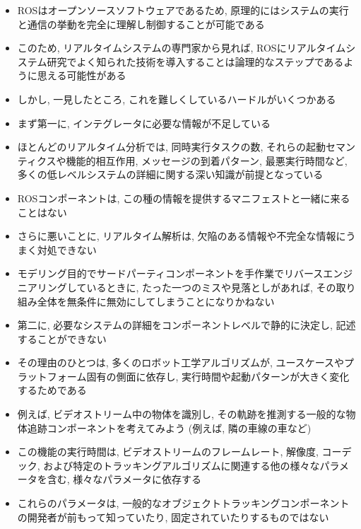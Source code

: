 \begin{frame}{}
    \begin{itemize}
        \item ROSはオープンソースソフトウェアであるため, 原理的にはシステムの実行と通信の挙動を完全に理解し制御することが可能である
        \item このため, リアルタイムシステムの専門家から見れば, ROSにリアルタイムシステム研究でよく知られた技術を導入することは論理的なステップであるように思える可能性がある
        \item しかし, 一見したところ, これを難しくしているハードルがいくつかある
    \end{itemize}
\end{frame}

\begin{frame}{}
    \begin{itemize}
        \item まず第一に, インテグレータに必要な情報が不足している
        \item ほとんどのリアルタイム分析では, 同時実行タスクの数, それらの起動セマンティクスや機能的相互作用, メッセージの到着パターン, 最悪実行時間など, 多くの低レベルシステムの詳細に関する深い知識が前提となっている
        \item ROSコンポーネントは, この種の情報を提供するマニフェストと一緒に来ることはない
        \item さらに悪いことに, リアルタイム解析は, 欠陥のある情報や不完全な情報にうまく対処できない
        \item モデリング目的でサードパーティコンポーネントを手作業でリバースエンジニアリングしているときに, たった一つのミスや見落としがあれば, その取り組み全体を無条件に無効にしてしまうことになりかねない
    \end{itemize}
\end{frame}

\begin{frame}{}
    \begin{itemize}
        \item 第二に, 必要なシステムの詳細をコンポーネントレベルで静的に決定し, 記述することができない
        \item その理由のひとつは, 多くのロボット工学アルゴリズムが, ユースケースやプラットフォーム固有の側面に依存し, 実行時間や起動パターンが大きく変化するためである
        \item 例えば, ビデオストリーム中の物体を識別し, その軌跡を推測する一般的な物体追跡コンポーネントを考えてみよう (例えば, 隣の車線の車など)
        \item この機能の実行時間は, ビデオストリームのフレームレート, 解像度, コーデック, および特定のトラッキングアルゴリズムに関連する他の様々なパラメータを含む, 様々なパラメータに依存する
        \item これらのパラメータは, 一般的なオブジェクトトラッキングコンポーネントの開発者が前もって知っていたり, 固定されていたりするものではない
    \end{itemize}
\end{frame}

